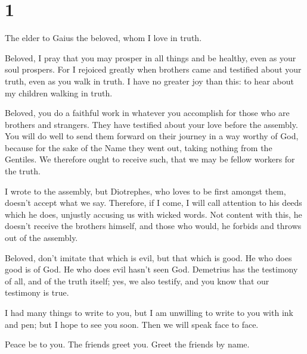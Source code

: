 \hypertarget{section}{%
\section{1}\label{section}}

 The elder to Gaius the beloved, whom I love in truth.

 Beloved, I pray that you may prosper in all things and be
healthy, even as your soul prospers.  For I rejoiced
greatly when brothers came and testified about your truth, even as you
walk in truth.  I have no greater joy than this: to hear
about my children walking in truth.

 Beloved, you do a faithful work in whatever you
accomplish for those who are brothers and strangers.  They
have testified about your love before the assembly. You will do well to
send them forward on their journey in a way worthy of God,
 because for the sake of the Name they went out, taking
nothing from the Gentiles.  We therefore ought to receive
such, that we may be fellow workers for the truth.

 I wrote to the assembly, but Diotrephes, who loves to be
first amongst them, doesn't accept what we say. 
Therefore, if I come, I will call attention to his deeds which he does,
unjustly accusing us with wicked words. Not content with this, he
doesn't receive the brothers himself, and those who would, he forbids
and throws out of the assembly.

 Beloved, don't imitate that which is evil, but that
which is good. He who does good is of God. He who does evil hasn't seen
God.  Demetrius has the testimony of all, and of the
truth itself; yes, we also testify, and you know that our testimony is
true.

 I had many things to write to you, but I am unwilling to
write to you with ink and pen;  but I hope to see you
soon. Then we will speak face to face.

Peace be to you. The friends greet you. Greet the friends by name.
